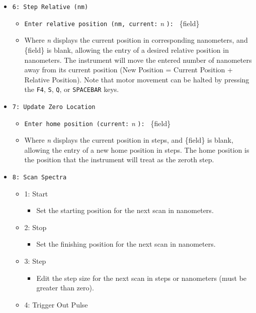 \documentclass{article}
\begin{document}
\begin{itemize}
\begin{itemize}
    \end{itemize}
    \item \verb|6: Step Relative (nm)|
    \begin{itemize}
        \item \verb|Enter relative position (nm, current:| \emph{n} \verb|): | \{field\}
        \item Where \emph{n} displays the current position in corresponding nanometers, and \{field\} is blank, allowing the entry of a desired relative position in nanometers. The instrument will move the entered number of nanometers away from its current position (New Position = Current Position + Relative Position). Note that motor movement can be halted by pressing the \verb|F4|, \verb|S|, \verb|Q|, or \verb|SPACEBAR| keys.
    \end{itemize}
    \item \verb|7: Update Zero Location|
    \begin{itemize}
        \item \verb|Enter home position (current:| \emph{n} \verb|): | \{field\}
        \item Where \emph{n} displays the current position in steps, and \{field\} is blank, allowing the entry of a new home position in steps. The home position is the position that the instrument will treat as the zeroth step.
    \end{itemize}
    \item \verb|8: Scan Spectra|
    \begin{itemize}
        \item 1: Start
        \begin{itemize}
            \item Set the starting position for the next scan in nanometers.
        \end{itemize}
        \item 2: Stop
        \begin{itemize}
            \item Set the finishing position for the next scan in nanometers.
        \end{itemize}
        \item 3: Step
        \begin{itemize}
            \item Edit the step size for the next scan in steps or nanometers (must be greater than zero).
        \end{itemize}
        \item 4: Trigger Out Pulse

\end{itemize}
\end{itemize}
\end{document}
